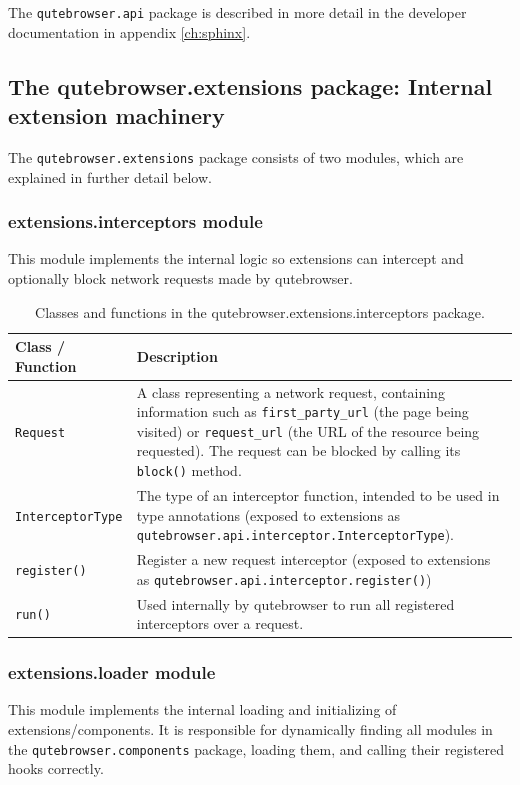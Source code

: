 \documentclass[a4paper,parskip=full,DIV=14,BCOR=15mm]{scrreprt}
\begin{document}
The \verb|qutebrowser.api| package is described in more detail in the developer
documentation in appendix \ref{ch:sphinx}.

\subsection[The qutebrowser.extensions package]{The qutebrowser.extensions package: Internal extension machinery}

The \verb|qutebrowser.extensions| package consists of two modules, which are
explained in further detail below.

\subsubsection{extensions.interceptors module}
This module implements the internal logic so extensions can intercept and
optionally block network requests made by qutebrowser.

\begin{table}[H]
  \centering
  \begin{tabulary}{\linewidth}{lL}
    \toprule
    Class / Function & Description \\
    \midrule
    \verb|Request| & A class representing a network request, containing
                     information such as \verb|first_party_url| (the page being
                     visited) or \verb|request_url| (the URL of the resource
                     being requested). The request can be blocked by calling its
                     \verb|block()| method. \\
    \verb|InterceptorType| & The type of an interceptor function, intended to be
                             used in type annotations (exposed to extensions as
                             \verb|qutebrowser.api.interceptor.InterceptorType|). \\
    \verb|register()| & Register a new request interceptor (exposed to
                       extensions as \verb|qutebrowser.api.interceptor.register()|) \\
    \verb|run()| & Used internally by qutebrowser to run all registered
                  interceptors over a request. \\
    \bottomrule
  \end{tabulary}
  \caption{Classes and functions in the qutebrowser.extensions.interceptors package.}
\end{table}

\subsubsection{extensions.loader module}
This module implements the internal loading and initializing of
extensions/components. It is responsible for dynamically finding all modules
in the \verb|qutebrowser.components| package, loading them, and calling their
registered hooks correctly.
\end{document}
